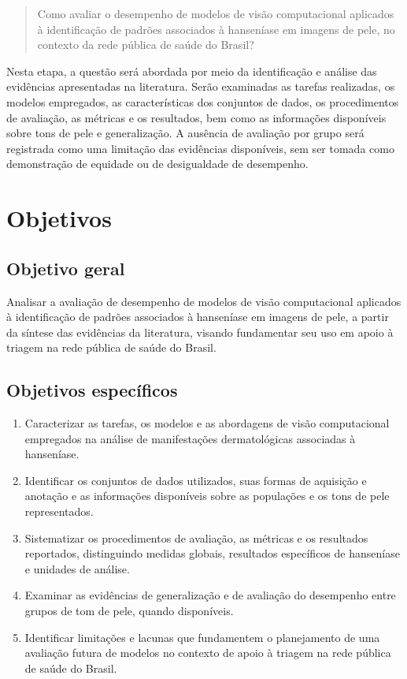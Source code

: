 \begin{quote}
Como avaliar o desempenho de modelos de visão computacional aplicados à
identificação de padrões associados à hanseníase em imagens de pele, no
contexto da rede pública de saúde do Brasil?
\end{quote}

Nesta etapa, a questão será abordada por meio da identificação e análise
das evidências apresentadas na literatura. Serão examinadas as tarefas
realizadas, os modelos empregados, as características dos conjuntos de
dados, os procedimentos de avaliação, as métricas e os resultados, bem
como as informações disponíveis sobre tons de pele e generalização. A
ausência de avaliação por grupo será registrada como uma limitação das
evidências disponíveis, sem ser tomada como demonstração de equidade ou
de desigualdade de desempenho.

\section{Objetivos}\label{objetivos}

\subsection{Objetivo geral}\label{objetivo-geral}

Analisar a avaliação de desempenho de modelos de visão computacional
aplicados à identificação de padrões associados à hanseníase em imagens
de pele, a partir da síntese das evidências da literatura, visando
fundamentar seu uso em apoio à triagem na rede pública de saúde do
Brasil.

\subsection{Objetivos específicos}\label{objetivos-especuxedficos}

\begin{enumerate}
\def\labelenumi{\arabic{enumi}.}
\tightlist
\item
  Caracterizar as tarefas, os modelos e as abordagens de visão
  computacional empregados na análise de manifestações dermatológicas
  associadas à hanseníase.
\item
  Identificar os conjuntos de dados utilizados, suas formas de aquisição
  e anotação e as informações disponíveis sobre as populações e os tons
  de pele representados.
\item
  Sistematizar os procedimentos de avaliação, as métricas e os
  resultados reportados, distinguindo medidas globais, resultados
  específicos de hanseníase e unidades de análise.
\item
  Examinar as evidências de generalização e de avaliação do desempenho
  entre grupos de tom de pele, quando disponíveis.
\item
  Identificar limitações e lacunas que fundamentem o planejamento de uma
  avaliação futura de modelos no contexto de apoio à triagem na rede
  pública de saúde do Brasil.
\end{enumerate}


